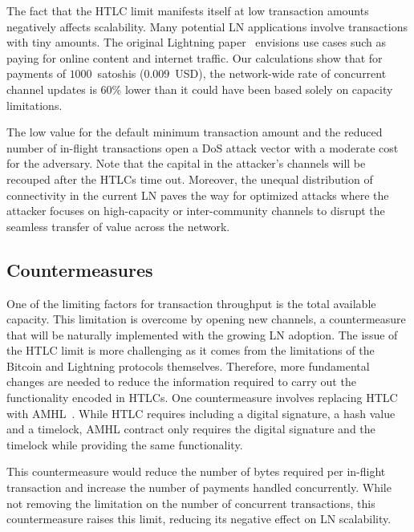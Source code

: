 The fact that the HTLC limit manifests itself at low transaction amounts negatively affects scalability.
Many potential LN applications involve transactions with tiny amounts.
The original Lightning paper~\cite{Poon2016} envisions use cases such as paying for online content and internet traffic.
Our calculations show that for payments of $1000$~satoshis ($0.009$~USD),
the network-wide rate of concurrent channel updates is $60\%$ lower 
than it could have been based solely on capacity limitations.

The low value for the default minimum transaction amount and the reduced number of in-flight transactions  
open a DoS attack vector with a moderate cost for the adversary.
Note that the capital in the attacker's channels will be recouped after the HTLCs time out.
Moreover, the unequal distribution of connectivity in the current LN paves the way for optimized attacks 
where the attacker focuses on high-capacity or inter-community channels to disrupt the 
seamless transfer of value across the network.


\subsection{Countermeasures}
One of the limiting factors for transaction throughput is the total available capacity.
This limitation is overcome by opening new channels, 
a countermeasure that will be naturally implemented with the growing LN adoption. 
The issue of the HTLC limit is more challenging as it comes from the limitations of the Bitcoin and Lightning protocols themselves.
Therefore, more fundamental changes are needed to reduce the information required to  
carry out the functionality encoded in HTLCs.
One countermeasure involves replacing HTLC with AMHL~\cite{Malavolta2019}. 
While HTLC requires including a digital signature, a hash value and a timelock, AMHL contract only requires the digital signature and the timelock while providing the same functionality. 


This countermeasure would reduce the number of bytes required per in-flight transaction 
and increase the number of payments handled concurrently.
While not removing the limitation on the number of concurrent transactions, 
this countermeasure raises this limit, reducing its negative effect on LN scalability.

